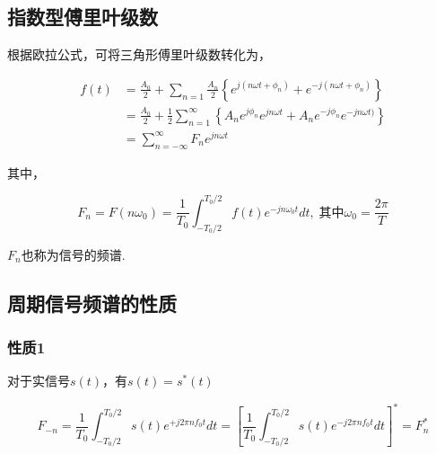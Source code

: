 \documentclass[UTF8]{article}
\theoremstyle{definition}
\begin{document}
\subsection{指数型傅里叶级数}
根据欧拉公式，可将三角形傅里叶级数转化为，

\begin{equation*}
\begin{aligned}
f(t) 
&=\frac{A_0}{2}+\sum_{n=1} \frac{A_n}{2}\left\{e^{j\left(n \omega t+\phi_n\right)}+e^{-j\left(n \omega t+\phi_n\right)}\right\}\\
&=\frac{A_0}{2}+\frac{1}{2} \sum_{n=1}^{\infty}\left\{A_n e^{j \phi_n} e^{j n \omega t}+A_n e^{-j \phi_n} e^{-j n \omega t)}\right\}\\
&=\sum_{n=-\infty}^{\infty} F_n e^{j n \omega t}
\end{aligned}
\end{equation*}

其中，


\begin{equation*}
F_n=F\left(n \omega_0\right)=\frac{1}{T_0} \int_{-T_0 / 2}^{T_0 / 2} f(t) e^{-j  n \omega_0 t} d t,\; \text{其中}\omega_0 = \frac{2\pi}{T}
\end{equation*}

$F_n$也称为信号的频谱.

\subsection{周期信号频谱的性质}
\subsubsection{性质1}
对于实信号$s(t)$，有$s(t) = s^*(t)$

\begin{equation*}
F_{-n}=\frac{1}{T_0} \int_{-T_0 / 2}^{T_0 / 2} s(t) e^{+j 2 \pi n f_0 t} d t=\left[\frac{1}{T_0} \int_{-T_0 / 2}^{T_0 / 2} s(t) e^{-j 2 \pi n f_0 t} d t\right]^*=F_n^*
\end{equation*}
\end{document}
